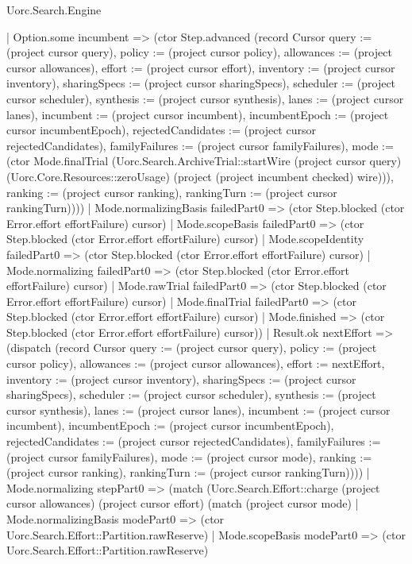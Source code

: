 \begin{lexlean}{Uorc.Search.Engine}
\begin{semanticmodule}
{          | Option.some incumbent => (ctor Step.advanced (record Cursor {query := (project cursor query), policy := (project cursor policy), allowances := (project cursor allowances), effort := (project cursor effort), inventory := (project cursor inventory), sharingSpecs := (project cursor sharingSpecs), scheduler := (project cursor scheduler), synthesis := (project cursor synthesis), lanes := (project cursor lanes), incumbent := (project cursor incumbent), incumbentEpoch := (project cursor incumbentEpoch), rejectedCandidates := (project cursor rejectedCandidates), familyFailures := (project cursor familyFailures), mode := (ctor Mode.finalTrial (Uorc.Search.ArchiveTrial::startWire (project cursor query) (Uorc.Core.Resources::zeroUsage) (project (project incumbent checked) wire))), ranking := (project cursor ranking), rankingTurn := (project cursor rankingTurn)})))
        | Mode.normalizingBasis failedPart0 => (ctor Step.blocked (ctor Error.effort effortFailure) cursor)
        | Mode.scopeBasis failedPart0 => (ctor Step.blocked (ctor Error.effort effortFailure) cursor)
        | Mode.scopeIdentity failedPart0 => (ctor Step.blocked (ctor Error.effort effortFailure) cursor)
        | Mode.normalizing failedPart0 => (ctor Step.blocked (ctor Error.effort effortFailure) cursor)
        | Mode.rawTrial failedPart0 => (ctor Step.blocked (ctor Error.effort effortFailure) cursor)
        | Mode.finalTrial failedPart0 => (ctor Step.blocked (ctor Error.effort effortFailure) cursor)
        | Mode.finished => (ctor Step.blocked (ctor Error.effort effortFailure) cursor))
      | Result.ok nextEffort => (dispatch (record Cursor {query := (project cursor query), policy := (project cursor policy), allowances := (project cursor allowances), effort := nextEffort, inventory := (project cursor inventory), sharingSpecs := (project cursor sharingSpecs), scheduler := (project cursor scheduler), synthesis := (project cursor synthesis), lanes := (project cursor lanes), incumbent := (project cursor incumbent), incumbentEpoch := (project cursor incumbentEpoch), rejectedCandidates := (project cursor rejectedCandidates), familyFailures := (project cursor familyFailures), mode := (project cursor mode), ranking := (project cursor ranking), rankingTurn := (project cursor rankingTurn)})))
    | Mode.normalizing stepPart0 => (match (Uorc.Search.Effort::charge (project cursor allowances) (project cursor effort) (match (project cursor mode)
        | Mode.normalizingBasis modePart0 => (ctor Uorc.Search.Effort::Partition.rawReserve)
        | Mode.scopeBasis modePart0 => (ctor Uorc.Search.Effort::Partition.rawReserve)
}
\end{semanticmodule}
\end{lexlean}

